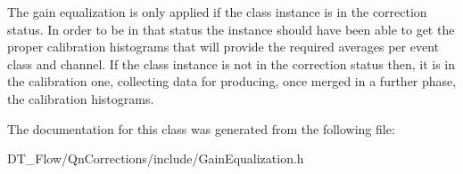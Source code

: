 The gain equalization is only applied if the class instance is in the correction status. In order to be in that status the instance should have been able to get the proper calibration histograms that will provide the required averages per event class and channel. If the class instance is not in the correction status then, it is in the calibration one, collecting data for producing, once merged in a further phase, the calibration histograms. 

The documentation for this class was generated from the following file\+:\begin{DoxyCompactItemize}
\item 
D\+T\+\_\+\+Flow/\+Qn\+Corrections/include/Gain\+Equalization.\+h\end{DoxyCompactItemize}
